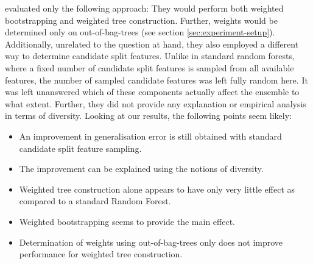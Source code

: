 \documentclass[../main.tex]{subfiles}
\begin{document}
\citeauthor{bernard-drf} evaluated only the following approach: They would perform both weighted bootstrapping and weighted tree construction. Further, weights would be determined only on out-of-bag-trees (see section \ref{sec:experiment-setup}). Additionally, unrelated to the question at hand, they also employed a different way to determine candidate split features. Unlike in standard random forests, where a fixed number of candidate split features is sampled from all available features, the number of sampled candidate features was left fully random here. It was left unanswered which of these components actually affect the ensemble to what extent. Further, they did not provide any explanation or empirical analysis in terms of diversity.
Looking at our results, the following points seem likely:
\begin{itemize}
    \item An improvement in generalisation error is still obtained with standard candidate split feature sampling.
    \item The improvement can be explained using the notions of diversity.
    \item Weighted tree construction alone appears to have only very little effect as compared to a standard Random Forest.
    \item Weighted bootstrapping seems to provide the main effect.
    \item Determination of weights using out-of-bag-trees only does not improve performance for weighted tree construction. 
\end{itemize}


\end{document}
